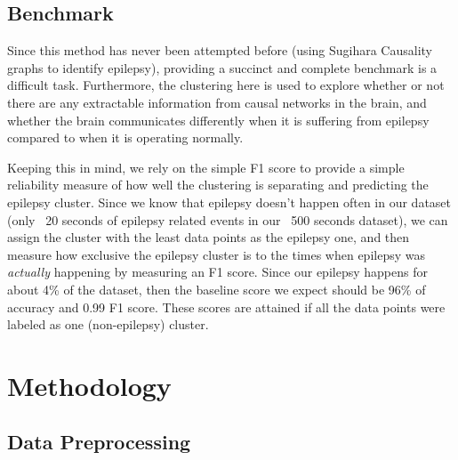 \documentclass[journal,12pt,onecolumn,draftclsnofoot]{IEEEtran}  %
\begin{document}
\subsection{Benchmark}
Since this method has never been attempted before (using Sugihara Causality graphs to identify epilepsy), providing a succinct and complete benchmark is a difficult task. Furthermore, the clustering here is used to explore whether or not there are any extractable information from causal networks in the brain, and whether the brain communicates differently when it is suffering from epilepsy compared to when it is operating normally. 

Keeping this in mind, we rely on the simple F1 score to provide a simple reliability measure of how well the clustering is separating and predicting the epilepsy cluster. Since we know that epilepsy doesn't happen often in our dataset (only ~20 seconds  of epilepsy related events in our ~500 seconds dataset), we can assign the cluster with the least data points as the epilepsy one, and then measure how exclusive the epilepsy cluster is to the times when epilepsy was \textit{actually} happening by measuring an F1 score. Since our epilepsy happens for about 4\% of the dataset, then the baseline score we expect should be 96\% of accuracy and 0.99 F1 score. These scores are attained if all the data points were labeled as one (non-epilepsy) cluster.


\section{Methodology}


\subsection{Data Preprocessing}
\end{document}
